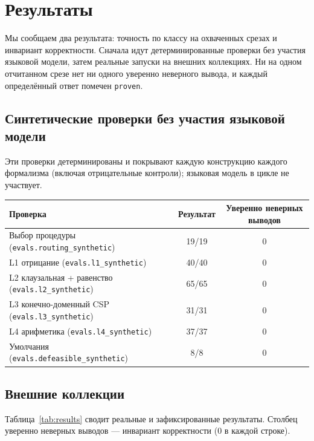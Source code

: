 \documentclass[11pt,a4paper]{article}
\begin{document}
\section{Результаты}
\label{sec:results}

Мы сообщаем два результата: точность по классу на охваченных срезах и инвариант корректности. Сначала идут детерминированные
проверки без участия языковой модели, затем реальные запуски на внешних коллекциях. Ни на одном отчитанном срезе нет ни
одного уверенно неверного вывода, и каждый определённый ответ помечен \texttt{proven}.

\subsection{Синтетические проверки без участия языковой модели}

Эти проверки детерминированы и покрывают каждую конструкцию каждого формализма (включая отрицательные контроли); языковая модель в цикле не участвует.

\begin{center}
\begin{tabular}{lcc}
\toprule
\textbf{Проверка} & \textbf{Результат} & \textbf{Уверенно неверных выводов} \\
\midrule
Выбор процедуры (\texttt{evals.routing\_synthetic}) & 19/19 & 0 \\
L1 отрицание (\texttt{evals.l1\_synthetic}) & 40/40 & 0 \\
L2 клаузальная + равенство (\texttt{evals.l2\_synthetic}) & 65/65 & 0 \\
L3 конечно-доменный CSP (\texttt{evals.l3\_synthetic}) & 31/31 & 0 \\
L4 арифметика (\texttt{evals.l4\_synthetic}) & 37/37 & 0 \\
Умолчания (\texttt{evals.defeasible\_synthetic}) & 8/8 & 0 \\
\bottomrule
\end{tabular}
\end{center}

\subsection{Внешние коллекции}

Таблица~\ref{tab:results} сводит реальные и зафиксированные результаты. Столбец уверенно неверных выводов — инвариант корректности (0 в каждой строке).
\end{document}

